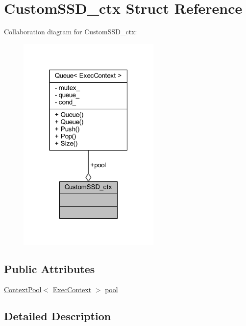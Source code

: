 \hypertarget{struct_custom_s_s_d__ctx}{}\section{Custom\+S\+S\+D\+\_\+ctx Struct Reference}
\label{struct_custom_s_s_d__ctx}


Collaboration diagram for Custom\+S\+S\+D\+\_\+ctx\+:\nopagebreak
\begin{figure}[H]
\begin{center}
\leavevmode
\includegraphics[width=199pt]{struct_custom_s_s_d__ctx__coll__graph}
\end{center}
\end{figure}
\subsection*{Public Attributes}
\begin{DoxyCompactItemize}
\item 
\mbox{\hyperlink{common_8h_a59ab5d85bff9594312b035d548be298f}{Context\+Pool}}$<$ \mbox{\hyperlink{class_exec_context}{Exec\+Context}} $>$ \mbox{\hyperlink{struct_custom_s_s_d__ctx_a2259ed0cb6edcac14eddb309d061c7f3}{pool}}
\end{DoxyCompactItemize}


\subsection{Detailed Description}


